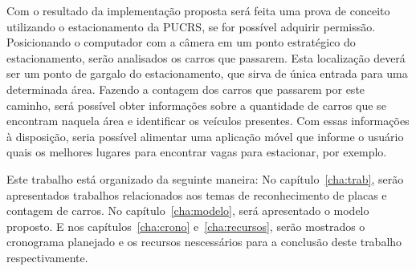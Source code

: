 Com o resultado da implementação proposta será feita uma prova de conceito
utilizando o estacionamento da PUCRS, se for possível adquirir permissão.
Posicionando o computador com a câmera em um ponto estratégico do
estacionamento, serão analisados os carros que passarem. Esta localização deverá
ser um ponto de gargalo do estacionamento, que sirva de única entrada para uma
determinada área. Fazendo a contagem dos carros que passarem por este caminho,
será possível obter informações sobre a quantidade de carros que se encontram
naquela área e identificar os veículos presentes. Com essas informações à
disposição, seria possível alimentar uma aplicação móvel que informe o usuário
quais os melhores lugares para encontrar vagas para estacionar, por exemplo.

Este trabalho está organizado da seguinte maneira: No capítulo~\ref{cha:trab},
serão apresentados trabalhos relacionados aos temas de reconhecimento de placas
e contagem de carros. No capítulo~\ref{cha:modelo}, será apresentado o modelo
proposto. E nos capítulos~\ref{cha:crono}  e~\ref{cha:recursos}, serão mostrados
o cronograma planejado e os recursos nescessários para a conclusão deste
trabalho respectivamente.

